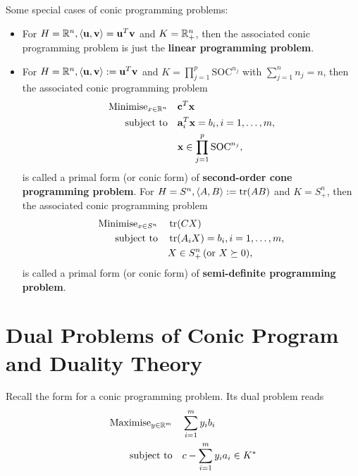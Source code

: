 Some special cases of conic programming problems:
\begin{itemize}
    \item For \(H = \mathbb{R}^n, \langle \mathbf{u}, \mathbf{v} \rangle = \mathbf{u}^T\mathbf{v}\) and \(K = \mathbb{R}_+^n\), then the associated conic programming problem is just the \textbf{linear programming problem}.
    \item For \(H = \mathbb{R}^n, \langle \mathbf{u}, \mathbf{v} \rangle := \mathbf{u}^T\mathbf{v}\) and \(K = \prod_{j = 1}^p \text{SOC}^{n_j}\) with \(\sum_{j = 1}^n n_j = n\), then the associated conic programming problem
          \begin{align*}
              \text{Minimise}_{x \in \mathbb{R}^n} \quad & \mathbf{c}^T\mathbf{x}                                  \\
              \text{subject to} \quad             & \mathbf{a}_i^T\mathbf{x} = b_i, i = 1,\dots, m,         \\
                                                  & \mathbf{x} \in \prod_{j = 1}^p \text{SOC}^{n_j},
          \end{align*}
          is called a primal form (or conic form) of \textbf{second-order cone programming problem}.
          For \(H = S^n, \langle A, B \rangle := \tr(AB)\) and \(K = S_+^n\), then the associated conic programming problem
          \begin{align*}
              \text{Minimise}_{x \in S^n} \quad & \tr(CX)                                  \\
              \text{subject to} \quad           & \tr(A_i X) = b_i, i = 1,\dots,m,         \\
                                                & X \in S_+^n \, (\text{or } X \succeq 0),
          \end{align*}
          is called a primal form (or conic form) of \textbf{semi-definite programming problem}.
\end{itemize}

\section{Dual Problems of Conic Program and Duality Theory}

Recall the form for a conic programming problem. Its dual problem reads
\begin{align*}
    \text{Maximise}_{y \in \mathbb{R}^m} \quad & \sum_{i = 1}^m y_ib_i             \\
    \text{subject to} \quad             & c - \sum_{i = 1}^m y_ia_i \in K^*
\end{align*}

